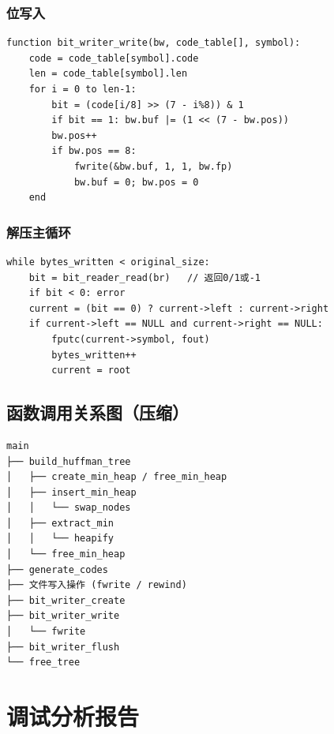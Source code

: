 \documentclass[UTF8]{ctexart}
\begin{document}
\subsubsection{位写入}
\begin{lstlisting}
function bit_writer_write(bw, code_table[], symbol):
    code = code_table[symbol].code
    len = code_table[symbol].len
    for i = 0 to len-1:
        bit = (code[i/8] >> (7 - i%8)) & 1
        if bit == 1: bw.buf |= (1 << (7 - bw.pos))
        bw.pos++
        if bw.pos == 8:
            fwrite(&bw.buf, 1, 1, bw.fp)
            bw.buf = 0; bw.pos = 0
    end
\end{lstlisting}

\subsubsection{解压主循环}
\begin{lstlisting}
while bytes_written < original_size:
    bit = bit_reader_read(br)   // 返回0/1或-1
    if bit < 0: error
    current = (bit == 0) ? current->left : current->right
    if current->left == NULL and current->right == NULL:
        fputc(current->symbol, fout)
        bytes_written++
        current = root
\end{lstlisting}

\subsection{函数调用关系图（压缩）}
\begin{verbatim}
main
├── build_huffman_tree
│   ├── create_min_heap / free_min_heap
│   ├── insert_min_heap
│   │   └── swap_nodes
│   ├── extract_min
│   │   └── heapify
│   └── free_min_heap
├── generate_codes
├── 文件写入操作 (fwrite / rewind)
├── bit_writer_create
├── bit_writer_write
│   └── fwrite
├── bit_writer_flush
└── free_tree
\end{verbatim}

\section{调试分析报告}
\end{document}
